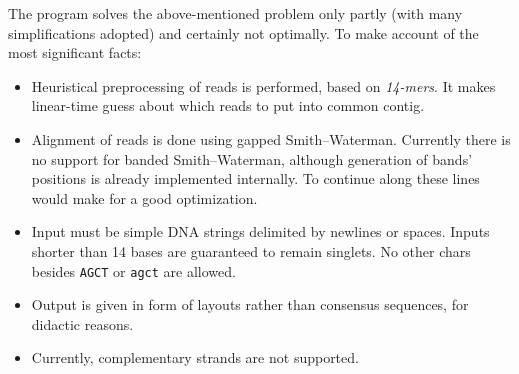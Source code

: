\documentclass[11pt, oneside]{article}
\begin{document}
The program solves the above-mentioned problem only partly (with many simplifications
adopted) and certainly not optimally. To make account of the most significant facts:
\begin{itemize}
\item
  Heuristical preprocessing of reads is performed, based on \emph{14-mers}.
  It makes linear-time guess about which reads to put into common contig.  
\item
  Alignment of reads is done using gapped Smith--Waterman. Currently there is no support for banded
  Smith--Waterman, although generation of bands' positions is already implemented internally.  
  To continue along these lines would make for a good optimization. 
\item
  Input must be simple DNA strings delimited by newlines or spaces. Inputs shorter than 14 bases
  are guaranteed to remain singlets. No other chars besides {\tt AGCT} or {\tt agct} are allowed.
\item
  Output is given in form of layouts rather than consensus sequences, for didactic reasons.
\item
  Currently, complementary strands are not supported.
\end{itemize}
\end{document}
